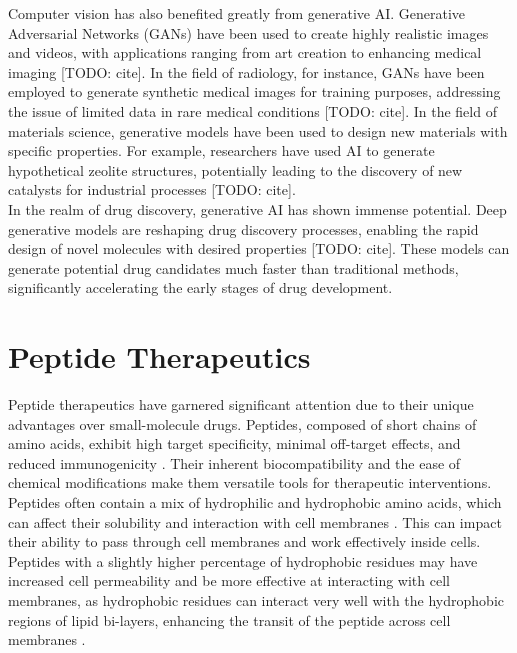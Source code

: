 Computer vision has also benefited greatly from generative AI. Generative Adversarial Networks (GANs) have been used to create highly realistic images and videos, with applications ranging from art creation to enhancing medical imaging [TODO: cite]. In the field of radiology, for instance, GANs have been employed to generate synthetic medical images for training purposes, addressing the issue of limited data in rare medical conditions [TODO: cite]. In the field of materials science, generative models have been used to design new materials with specific properties. For example, researchers have used AI to generate hypothetical zeolite structures, potentially leading to the discovery of new catalysts for industrial processes [TODO: cite]. \\

In the realm of drug discovery, generative AI has shown immense potential. Deep generative models are reshaping drug discovery processes, enabling the rapid design of novel molecules with desired properties [TODO: cite]. These models can generate potential drug candidates much faster than traditional methods, significantly accelerating the early stages of drug development.

\section{Peptide Therapeutics} 
Peptide therapeutics have garnered significant attention due to their unique advantages over
small-molecule drugs. Peptides, composed of short chains of amino acids, exhibit high target
specificity, minimal off-target effects, and reduced immunogenicity \cite{wang2022therapeutic}.
Their inherent biocompatibility and the ease of chemical modifications make them versatile tools for
therapeutic interventions. Peptides often contain a mix of hydrophilic and hydrophobic amino acids,
which can affect their solubility and interaction with cell membranes \cite{madani2011mech}. This
can impact their ability to pass through cell membranes and work effectively inside cells. Peptides
with a slightly higher percentage of hydrophobic residues may have increased cell permeability
\cite{madani2011mech} and be more effective at interacting with cell membranes, as hydrophobic
residues can interact very well with the hydrophobic regions of lipid bi-layers, enhancing the
transit of the peptide across cell membranes \cite{madani2011mech}. \\

